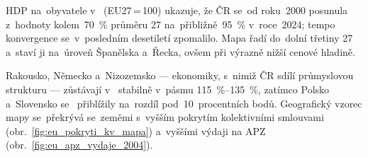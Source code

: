 \Ac{HDP} na~obyvatele v~ (\acs{EU}27\,=\,100) ukazuje, že \ac{ČR} se~od roku~2000 posunula z~hodnoty kolem~\SI{70}{\percent} průměru 27 na~přibližně~\SI{95}{\percent} v~roce~2024; tempo konvergence se~v~posledním desetiletí zpomalilo. Mapa řadí  do~dolní třetiny 27 a~staví ji na~úroveň Španělska a~Řecka, ovšem při výrazně nižší cenové hladině.

Rakousko, Německo a~Nizozemsko --- ekonomiky, s~nimiž \ac{ČR} sdílí průmyslovou strukturu --- zůstávají v~ stabilně v~pásmu \SIrange{115}{135}{\percent}, zatímco Polsko a~Slovensko se~ přiblížily na~rozdíl pod~10~procentních bodů. Geografický vzorec mapy se~překrývá se~zeměmi s~vyšším pokrytím kolektivními smlouvami (obr.~\ref{fig:eu_pokryti_kv_mapa}) a~vyššími výdaji na \ac{APZ} (obr.~\ref{fig:eu_apz_vydaje_2004}).


